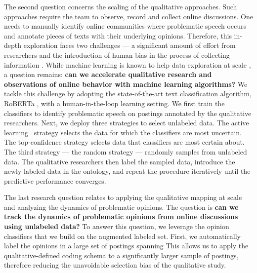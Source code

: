 The second question concerns the scaling of the qualitative approaches.
Such approaches require the team to observe, record and collect online discussions. 
One needs to manually identify online communities where problematic speech occurs and annotate pieces of texts with their underlying opinions.
Therefore, this in-depth exploration faces two challenges --- a significant amount of effort from researchers and the introduction of human bias in the process of collecting information \citep{dixon2016computer}.
While machine learning is known to help data exploration at scale \citep{lin2012large}, a question remains:
\textbf{can we accelerate qualitative research and observations of online behavior with machine learning algorithms?}
We tackle this challenge by adopting the state-of-the-art text classification algorithm, RoBERTa \citep{vaswani2017attention,liu2019roberta}, with a human-in-the-loop learning setting.
We first train the classifiers to identify problematic speech on postings annotated by the qualitative researchers. 
Next, we deploy three strategies to select unlabeled data. 
The active learning~\citep{settles2012active} strategy selects the data for which the classifiers are most uncertain.
The top-confidence strategy selects data that classifiers are most certain about.
The third strategy --- the random strategy --- randomly samples from unlabeled data. 
The qualitative researchers then label the sampled data, introduce the newly labeled data in the ontology, and repeat the procedure iteratively until the predictive performance converges.

The last research question relates to applying the qualitative mapping at scale and analyzing the dynamics of problematic opinions.
The question is \textbf{can we track the dynamics of problematic opinions from online discussions using unlabeled data?}
To answer this question, we leverage the opinion classifiers that we build on the augmented labeled set.
First, we automatically label the opinions in a large set of postings spanning 
This allows us to apply the qualitative-defined coding schema to a significantly larger sample of postings, therefore reducing the unavoidable selection bias of the qualitative study.


